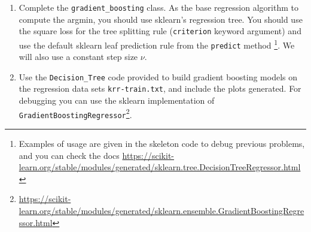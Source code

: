 \documentclass{article}
\newcommand{\nyuparagraph}[1]{\vspace{0.3cm}\textcolor{nyupurple}{\bf \large #1}\\}
\theoremstyle{plain}
\theoremstyle{definition}
\begin{document}
\begin{enumerate}
\setcounter{enumi}{\value{saveenum}}
  
\item Complete the \texttt{gradient\_boosting} class. As the base regression
algorithm to compute the argmin, you should use sklearn's regression tree. You should use
the square loss for the tree splitting rule (\texttt{criterion} keyword argument) and use the default sklearn leaf prediction rule from the \texttt{predict} method \footnote{Examples of usage are given in the skeleton code to debug previous problems, and you can check the docs \url{https://scikit-learn.org/stable/modules/generated/sklearn.tree.DecisionTreeRegressor.html}}. We will also use a constant step size $\nu$.

\item Use the \texttt{Decision\_Tree} code provided to build gradient
boosting models on the regression data sets \texttt{krr-train.txt}, and include the plots generated. For debugging you can use the sklearn implementation of \texttt{GradientBoostingRegressor}\footnote{\url{https://scikit-learn.org/stable/modules/generated/sklearn.ensemble.GradientBoostingRegressor.html}}.
\setcounter{saveenum}{\value{enumi}}

\end{enumerate}



  
\end{document}
